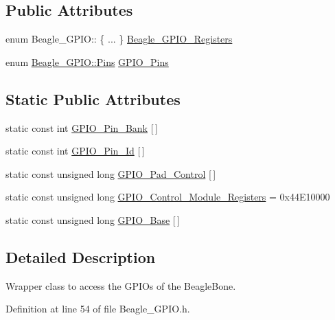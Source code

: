 \subsection*{\-Public \-Attributes}
\begin{DoxyCompactItemize}
\item 
enum \-Beagle\-\_\-\-G\-P\-I\-O\-:: \{ ... \}  \hyperlink{class_beagle___g_p_i_o_a0164dbfd9376ef3a1e0a404d5cf2f431}{\-Beagle\-\_\-\-G\-P\-I\-O\-\_\-\-Registers}
\item 
enum \hyperlink{class_beagle___g_p_i_o_a9b1fd560ea5d2d65898ac15c23055e58}{\-Beagle\-\_\-\-G\-P\-I\-O\-::\-Pins} \hyperlink{class_beagle___g_p_i_o_ae173a49845ccc4d980cc0eb83a990418}{\-G\-P\-I\-O\-\_\-\-Pins}
\end{DoxyCompactItemize}
\subsection*{\-Static \-Public \-Attributes}
\begin{DoxyCompactItemize}
\item 
static const int \hyperlink{class_beagle___g_p_i_o_ae7919c981429a17c48c601664a61d64a}{\-G\-P\-I\-O\-\_\-\-Pin\-\_\-\-Bank} \mbox{[}$\,$\mbox{]}
\item 
static const int \hyperlink{class_beagle___g_p_i_o_a9a48339b54de8e6c884ddad8629a3647}{\-G\-P\-I\-O\-\_\-\-Pin\-\_\-\-Id} \mbox{[}$\,$\mbox{]}
\item 
static const unsigned long \hyperlink{class_beagle___g_p_i_o_ae4a0a2a56a0ba31145a5f41eb3439886}{\-G\-P\-I\-O\-\_\-\-Pad\-\_\-\-Control} \mbox{[}$\,$\mbox{]}
\item 
static const unsigned long \hyperlink{class_beagle___g_p_i_o_a45dea13988842b47f592806fd15f1262}{\-G\-P\-I\-O\-\_\-\-Control\-\_\-\-Module\-\_\-\-Registers} = 0x44\-E10000
\item 
static const unsigned long \hyperlink{class_beagle___g_p_i_o_ab259232b938bf1892836737c07610384}{\-G\-P\-I\-O\-\_\-\-Base} \mbox{[}$\,$\mbox{]}
\end{DoxyCompactItemize}


\subsection{\-Detailed \-Description}
\-Wrapper class to access the \-G\-P\-I\-Os of the \-Beagle\-Bone. 

\-Definition at line 54 of file \-Beagle\-\_\-\-G\-P\-I\-O.\-h.



